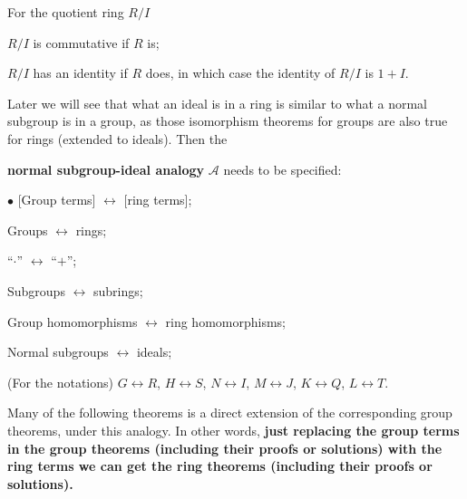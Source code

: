 \documentclass{article}
\begin{document}
\begin{Rmk}{}
    \textcolor{Th}{For the quotient ring $R/I$
    \begin{compactenum}
        \item $R/I$ is commutative if $R$ is;
        \item $R/I$ has an identity if $R$ does, in which case the identity of $R/I$ is $1+I$.
    \end{compactenum}}
    Later we will see that what an ideal is in a ring is similar to what a normal subgroup is in a group, as those isomorphism theorems for groups are also true for rings (extended to ideals). Then the \textcolor{Df}{\textbf{normal subgroup-ideal analogy} $\mathcal{A}$ needs to be specified:
    \begin{compactenum}
        \item[$\bullet$] [Group terms] $\leftrightarrow$ [ring terms];
        \item Groups $\leftrightarrow$ rings;
        \item ``$\cdot$'' $\leftrightarrow$ ``$+$'';
        \item Subgroups $\leftrightarrow$ subrings;
        \item Group homomorphisms $\leftrightarrow$ ring homomorphisms;
        \item Normal subgroups $\leftrightarrow$ ideals;
        \item (For the notations) $G\leftrightarrow R$, $H\leftrightarrow S$, $N\leftrightarrow I$, $M\leftrightarrow J$, $K\leftrightarrow Q$, $L\leftrightarrow T$.
    \end{compactenum}}
    Many of the following theorems is a direct extension of the corresponding group theorems, under this analogy. In other words, \textbf{just replacing the group terms in the group theorems (including their proofs or solutions) with the ring terms we can get the ring theorems (including their proofs or solutions).} 
\end{Rmk}
\end{document}
